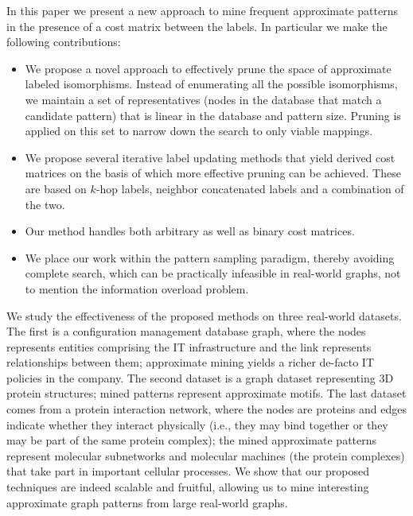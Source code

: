 In this paper we present a new approach to mine frequent approximate
patterns in the presence of a cost matrix between the labels. In
particular we make the following contributions:
\begin{itemize}
\item We propose a novel approach to effectively prune the space of
  approximate labeled isomorphisms. Instead of enumerating all the
  possible isomorphisms, we maintain a set of representatives (nodes in
  the database that match a candidate pattern) that is linear in the
  database and pattern size. Pruning is applied on this set to narrow
  down the search to only viable mappings.
\item We propose several iterative label updating methods that yield
  derived cost matrices on the basis of which more effective 
  pruning can be achieved. These are based on $k$-hop labels, neighbor
  concatenated labels and a combination of the two.
\item Our method handles both arbitrary as well as binary cost matrices.
\item We place our work within the pattern sampling paradigm, 
  thereby avoiding complete search, which can be practically 
  infeasible in real-world
  graphs, not to mention the information overload problem.
\end{itemize}
We study the effectiveness of the proposed methods on three real-world
datasets. The first is a configuration management database graph, 
where the nodes represents
entities comprising the IT infrastructure and the link represents
relationships between them; approximate mining yields a richer de-facto IT
policies in the company. The second dataset is a graph dataset
representing 3D protein structures; mined patterns represent approximate
motifs. The last dataset comes from a protein interaction network, where
the nodes are proteins and edges indicate whether they interact
physically (i.e., they may bind together or they may be part of the
same protein complex); the mined approximate patterns represent
molecular subnetworks and molecular machines (the protein complexes)
that take part in important cellular processes. We show that our
proposed techniques are indeed scalable and fruitful, allowing us
to mine interesting approximate graph patterns from 
large real-world graphs.
